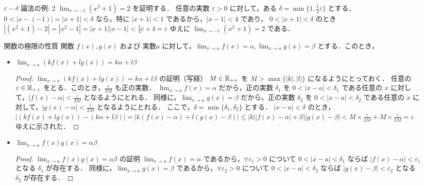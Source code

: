 \documentclass[xelatex,ja=standard,jafont=noto]{bxjsarticle}
\begin{document}
  \begin{tcb}{$\varepsilon - \delta$ 論法の例: 2}{}
    $\displaystyle \lim_{x \to -1} (x^2 + 1) = 2$ を証明する．
    任意の実数 $\varepsilon >0 $ に対して，ある $\delta = \min\{1, \frac{1}{4}\varepsilon\}$ とする．
    $0 < |x - (-1)| = |x + 1| < \delta$ なら，特に $|x + 1| < 1$ であるから，$|x - 1| < 4$ であり，
    $0 < |x + 1| < \delta$ のとき $|(x^2 + 1) - 2| = |x^2 - 1| = |x + 1| |x - 1| < \frac{1}{4}\varepsilon \times 4 = \varepsilon$
    ゆえに $\displaystyle \lim_{x \to -1} (x^2 + 1) = 2$ である．
  \end{tcb}

  \begin{theorem}{関数の極限の性質}{}
    関数 $f(x), g(x)$ および 実数$a$ に対して，$\displaystyle \lim_{x \to a} f(x) = \alpha, \lim_{x \to a} g(x) = \beta$ とする．このとき，
    \begin{itemize}
      \item $\displaystyle \lim_{x \to a} (k f(x) + l g(x)) = k\alpha + l\beta$
      \begin{proof}{$\displaystyle \lim_{x \to a} (k f(x) + l g(x)) = k\alpha + l\beta$ の証明（写経）}{}
        $M \in \mathbb{R}_{++}$ を $M > \max\{|k|, |l|\}$ になるようにとっておく．
        任意の $\varepsilon \in \mathbb{R}_{++}$ をとる．このとき，$\frac{\varepsilon}{2M}$ も正の実数．
        $\lim_{x \to a} f(x) = \alpha$ だから，正の実数 $\delta_1$ を $0 < |x - a| < \delta_1$ である任意の $x$ に対して，$|f(x) - \alpha| < \frac{\varepsilon}{2M}$ となるようにとれる．
        同様に，$\lim_{x \to a} g(x) = \beta$ だから，正の実数 $\delta_2$ を $0 < |x - a| < \delta_2$ である任意の $x$ に対して，$|g(x) - \alpha| < \frac{\varepsilon}{2M}$ となるようにとれる．
        ここで，$\delta= \min\{\delta_1, \delta_2\}$ とする． $|x - a| < \delta$ のとき，$|(kf(x) + lg(x)) - (k\alpha + l \beta)| 
        = |k(f(x) - \alpha) + l(g(x) - \beta)| \leq |k||f(x) - \alpha| + |l| |g(x) - \beta| < M \times \frac{\varepsilon}{2M} + M \times \frac{\varepsilon}{2M} = \varepsilon$
        ゆえに示された．
      \end{proof}
      \item $\displaystyle \lim_{x \to a} f(x)g(x) = \alpha\beta$ 
      \begin{proof}{$\displaystyle \lim_{x \to a} f(x)g(x) = \alpha\beta$ の証明}{}
        $\lim_{x \to a} f(x) = \alpha$ であるから，$\forall\varepsilon_1 > 0$ について $0 < |x - a| < \delta_1$ ならば $|f(x) - \alpha| < \varepsilon_1$ となる $\delta_1$ が存在する．
        同様に，$\lim_{x \to a} g(x) = \beta$ であるから，$\forall\varepsilon_2 > 0$ について $0 < |x - a| < \delta_2$ ならば $|g(x) - \beta| < \varepsilon_2$ となる $\delta_2$ が存在する．

\end{proof}
\end{itemize}
\end{theorem}
\end{document}

